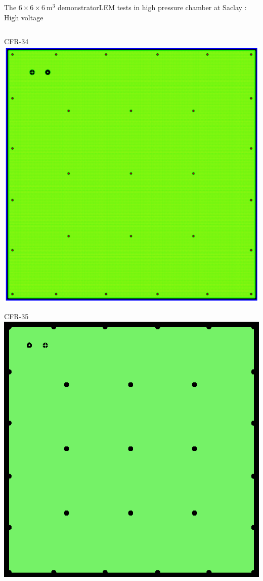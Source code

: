 \documentclass[10pt]{beamer}
\begin{document}
\begin{frame}{The \texorpdfstring{$6 \times 6 \times \SI{6}{\meter\cubed}$}{666} demonstrator}{LEM tests in high pressure chamber at Saclay : High voltage}
\begin{scriptsize}
\begin{columns}
\begin{column}{0.48\textwidth}
	    			\begin{minipage}{0.48\textwidth}
	    				\centering CFR-34
	    				\includegraphics[width=\textwidth]{figures/666/CFR-34.png}
	    			\end{minipage}\hfill
	    			\begin{minipage}{0.48\textwidth}
	    				\centering CFR-35
	    				\includegraphics[width=\textwidth]{figures/666/CFR-35.png}

\end{minipage}
\end{column}
\end{columns}
\end{scriptsize}
\end{frame}
\end{document}
